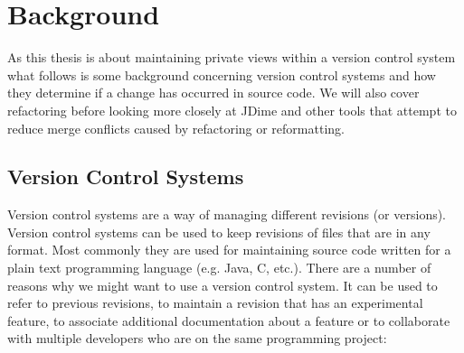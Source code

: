 \chapter{Background}

As this thesis is about maintaining private views within a version control system what follows is some background concerning version control systems and how they determine if a change has occurred in source code.  
We will also cover refactoring before looking more closely at JDime and other tools that attempt to reduce merge conflicts caused by refactoring or reformatting.  

\section{Version Control Systems}
Version control systems are a way of managing different revisions (or versions). 
Version control systems can be used to keep revisions of files that are in any format. 
Most commonly they are used for maintaining source code written for a plain text programming language (e.g. Java, C, etc.). 
There are a number of reasons why we might want to use a version control system. It can be used to refer to previous revisions, to maintain a revision that has an experimental feature, to associate additional documentation about a feature or to collaborate with multiple developers who are on the same programming project:

